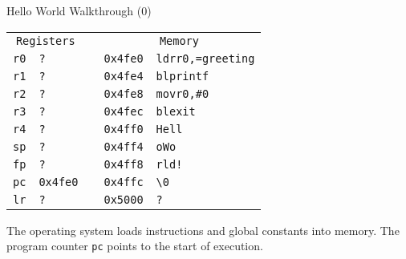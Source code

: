 \begin{frame}{Hello World Walkthrough (0)}
	\begin{alltt}
		\begin{tabular}{ r | l p{5mm} r | l }
			\multicolumn{2}{c}{Registers} &        & \multicolumn{2}{c}{Memory}                              \\
			r0                            & ?      &                            & 0x4fe0 & ldr r0, =greeting \\
			r1                            & ?      &                            & 0x4fe4 & bl printf         \\
			r2                            & ?      &                            & 0x4fe8 & mov r0, \#0       \\
			r3                            & ?      &                            & 0x4fec & bl exit           \\
			r4                            & ?      &                            & 0x4ff0 & Hell              \\
			sp                            & ?      &                            & 0x4ff4 & o Wo              \\
			fp                            & ?      &                            & 0x4ff8 & rld!              \\
			pc                            & 0x4fe0 &                            & 0x4ffc & {\textbackslash}0 \\
			lr                            & ?      &                            & 0x5000 & ?                 \\
		\end{tabular}
	\end{alltt}

	The operating system loads instructions and global constants into memory. The program counter \texttt{pc} points to the start of execution.

\end{frame}

